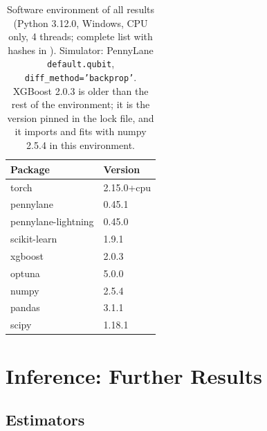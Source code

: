 \documentclass[11pt,a4paper]{article}
\begin{document}
\begin{table}[htbp]
\centering
\caption{Software environment of all results (Python 3.12.0, Windows, CPU only, 4 threads; complete list with hashes in \protect{}). Simulator: PennyLane \texttt{default.qubit}, \texttt{diff\_method='backprop'}. XGBoost 2.0.3 is older than the rest of the environment; it is the version pinned in the lock file, and it imports and fits with numpy 2.5.4 in this environment.}
\label{tab:software_env}
{\small
\begin{tabular}{ll}
\toprule
\textbf{Package} & \textbf{Version} \\
\midrule
torch & 2.15.0+cpu \\
pennylane & 0.45.1 \\
pennylane-lightning & 0.45.0 \\
scikit-learn & 1.9.1 \\
xgboost & 2.0.3 \\
optuna & 5.0.0 \\
numpy & 2.5.4 \\
pandas & 3.1.1 \\
scipy & 1.18.1 \\
\bottomrule
\end{tabular}}
\end{table}

\section{Inference: Further Results}
\label{app:inference}

\subsection{Estimators}
\label{app:noise_budget}
\end{document}
